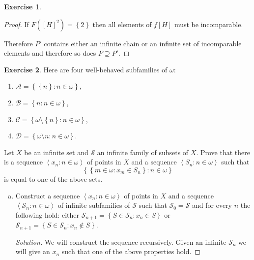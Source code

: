\documentclass{article}
\theoremstyle{definition}
\newtheorem{question}{Exercise}
\newcommand{\set}[1]{\left\{#1\right\}}
\newcommand{\setwith}[2]{\set{#1\colon#2}}
\newcommand{\sequence}[2]{\left<#1:#2\right>}
\newenvironment{solution}{\begin{proof}[Solution]}{\end{proof}}
\begin{document}
\begin{question}
\begin{enumerate}[a.]
\begin{proof}
                  If \(F([H]^{2})=\set{2}\) then all elements of \(f[H]\) must
                  be incomparable.

                  Therefore \(P'\) contains either an infinite chain
                  or an infinite set of incomparable elements and therefore so
                  does \(P\supseteq P'\).
              \end{proof}
    \end{enumerate}
\end{question}

\begin{question}
    Here are four well-behaved subfamilies of \(\omega\):
    \begin{enumerate}[(1)]
        \item \(\mathcal{A}=\setwith{\set{n}}{n\in\omega}\),
        \item \(\mathcal{B}=\setwith{n}{n\in\omega}\),
        \item \(\mathcal{C}=\setwith{\omega\setminus\set{n}}{n\in\omega}\),
        \item \(\mathcal{D}=\setwith{\omega\setminus n}{n\in\omega}\).
    \end{enumerate}
    Let \(X\) be an infinite set and \(\mathcal{S}\) an infinite family of
    subsets of \(X\). Prove that there is a sequence
    \(\sequence{x_{n}}{n\in\omega}\) of points in \(X\) and a sequence
    \(\sequence{S_{n}}{n\in\omega}\) such that
    \[
        \setwith{\setwith{m\in\omega}{x_{m}\in S_{n}}}{n\in\omega}
    \]
    is equal to one of the above sets.

    \begin{enumerate}[a.]
        \item Construct a sequence \(\sequence{x_{n}}{n\in\omega}\) of points in
              \(X\) and a sequence \(\sequence{\mathcal{S}_{n}}{n\in\omega}\) of
              infinite subfamilies of \(\mathcal{S}\) such that
              \(\mathcal{S}_{0}=\mathcal{S}\) and for every \(n\) the following
              hold: either
              \(\mathcal{S}_{n+1}=\setwith{S\in\mathcal{S}_{n}}{x_{n}\in S}\) or
              \(\mathcal{S}_{n+1}=\setwith{S\in\mathcal{S}_{n}}{x_{n}\notin
                  S}\).

              \begin{solution}
                  We will construct the sequence recursively. Given an infinite
                  \(\mathcal{S}_{n}\) we will give an \(x_{n}\) such that one of
                  the above properties hold.


\end{solution}
\end{enumerate}
\end{question}
\end{document}
